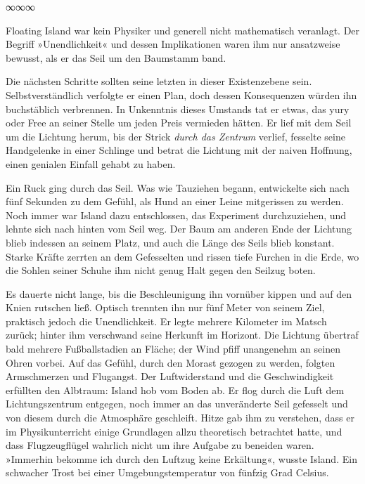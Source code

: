 \begin{center}
	∞∞∞
\end{center}

Floating Island war kein Physiker und generell nicht mathematisch veranlagt. Der Begriff »Unendlichkeit« und dessen Implikationen waren ihm nur ansatzweise bewusst, als er das Seil um den Baumstamm band.

Die nächsten Schritte sollten seine letzten in dieser Existenzebene sein. Selbstverständlich verfolgte er einen Plan, doch dessen Konsequenzen würden ihn buchstäblich verbrennen. In Unkenntnis dieses Umstands tat er etwas, das yury oder Free an seiner Stelle um jeden Preis vermieden hätten. Er lief mit dem Seil um die Lichtung herum, bis der Strick \emph{durch das Zentrum} verlief, fesselte seine Handgelenke in einer Schlinge und betrat die Lichtung mit der naiven Hoffnung, einen genialen Einfall gehabt zu haben.

Ein Ruck ging durch das Seil. Was wie Tauziehen begann, entwickelte sich nach fünf Sekunden zu dem Gefühl, als Hund an einer Leine mitgerissen zu werden. Noch immer war Island dazu entschlossen, das Experiment durchzuziehen, und lehnte sich nach hinten vom Seil weg. Der Baum am anderen Ende der Lichtung blieb indessen an seinem Platz, und auch die Länge des Seils blieb konstant. Starke Kräfte zerrten an dem Gefesselten und rissen tiefe Furchen in die Erde, wo die Sohlen seiner Schuhe ihm nicht genug Halt gegen den Seilzug boten.

Es dauerte nicht lange, bis die Beschleunigung ihn vornüber kippen und auf den Knien rutschen ließ. Optisch trennten ihn nur fünf Meter von seinem Ziel, praktisch jedoch die Unendlichkeit. Er legte mehrere Kilometer im Matsch zurück; hinter ihm verschwand seine Herkunft im Horizont. Die Lichtung übertraf bald mehrere Fußballstadien an Fläche; der Wind pfiff unangenehm an seinen Ohren vorbei. Auf das Gefühl, durch den Morast gezogen zu werden, folgten Armschmerzen und Flugangst. Der Luftwiderstand und die Geschwindigkeit erfüllten den Albtraum: Island hob vom Boden ab. Er flog durch die Luft dem Lichtungszentrum entgegen, noch immer an das unveränderte Seil gefesselt und von diesem durch die Atmosphäre geschleift. Hitze gab ihm zu verstehen, dass er im Physikunterricht einige Grundlagen allzu theoretisch betrachtet hatte, und dass Flugzeugflügel wahrlich nicht um ihre Aufgabe zu beneiden waren. »Immerhin bekomme ich durch den Luftzug keine Erkältung«, wusste Island. Ein schwacher Trost bei einer Umgebungstemperatur von fünfzig Grad Celsius.

